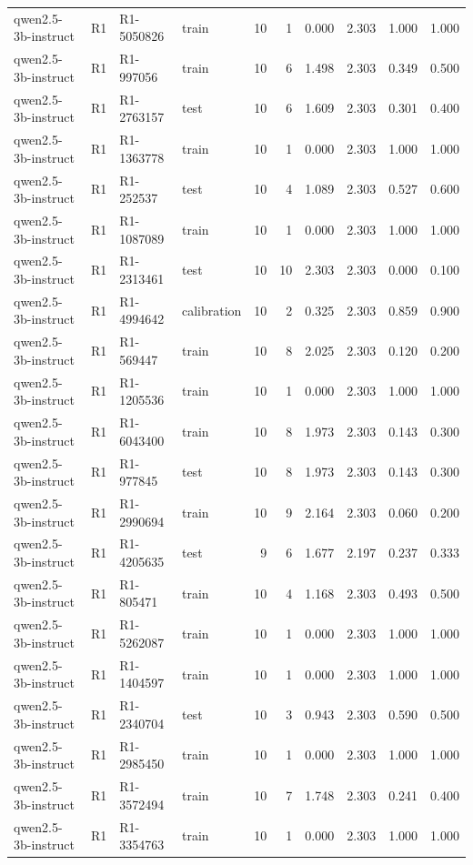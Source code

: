 \begin{table}
\begin{tabular}{llllrrrrrr}
qwen2.5-3b-instruct & R1 & R1-5050826 & train & 10 & 1 & 0.000 & 2.303 & 1.000 & 1.000 \\
qwen2.5-3b-instruct & R1 & R1-997056 & train & 10 & 6 & 1.498 & 2.303 & 0.349 & 0.500 \\
qwen2.5-3b-instruct & R1 & R1-2763157 & test & 10 & 6 & 1.609 & 2.303 & 0.301 & 0.400 \\
qwen2.5-3b-instruct & R1 & R1-1363778 & train & 10 & 1 & 0.000 & 2.303 & 1.000 & 1.000 \\
qwen2.5-3b-instruct & R1 & R1-252537 & test & 10 & 4 & 1.089 & 2.303 & 0.527 & 0.600 \\
qwen2.5-3b-instruct & R1 & R1-1087089 & train & 10 & 1 & 0.000 & 2.303 & 1.000 & 1.000 \\
qwen2.5-3b-instruct & R1 & R1-2313461 & test & 10 & 10 & 2.303 & 2.303 & 0.000 & 0.100 \\
qwen2.5-3b-instruct & R1 & R1-4994642 & calibration & 10 & 2 & 0.325 & 2.303 & 0.859 & 0.900 \\
qwen2.5-3b-instruct & R1 & R1-569447 & train & 10 & 8 & 2.025 & 2.303 & 0.120 & 0.200 \\
qwen2.5-3b-instruct & R1 & R1-1205536 & train & 10 & 1 & 0.000 & 2.303 & 1.000 & 1.000 \\
qwen2.5-3b-instruct & R1 & R1-6043400 & train & 10 & 8 & 1.973 & 2.303 & 0.143 & 0.300 \\
qwen2.5-3b-instruct & R1 & R1-977845 & test & 10 & 8 & 1.973 & 2.303 & 0.143 & 0.300 \\
qwen2.5-3b-instruct & R1 & R1-2990694 & train & 10 & 9 & 2.164 & 2.303 & 0.060 & 0.200 \\
qwen2.5-3b-instruct & R1 & R1-4205635 & test & 9 & 6 & 1.677 & 2.197 & 0.237 & 0.333 \\
qwen2.5-3b-instruct & R1 & R1-805471 & train & 10 & 4 & 1.168 & 2.303 & 0.493 & 0.500 \\
qwen2.5-3b-instruct & R1 & R1-5262087 & train & 10 & 1 & 0.000 & 2.303 & 1.000 & 1.000 \\
qwen2.5-3b-instruct & R1 & R1-1404597 & train & 10 & 1 & 0.000 & 2.303 & 1.000 & 1.000 \\
qwen2.5-3b-instruct & R1 & R1-2340704 & test & 10 & 3 & 0.943 & 2.303 & 0.590 & 0.500 \\
qwen2.5-3b-instruct & R1 & R1-2985450 & train & 10 & 1 & 0.000 & 2.303 & 1.000 & 1.000 \\
qwen2.5-3b-instruct & R1 & R1-3572494 & train & 10 & 7 & 1.748 & 2.303 & 0.241 & 0.400 \\
qwen2.5-3b-instruct & R1 & R1-3354763 & train & 10 & 1 & 0.000 & 2.303 & 1.000 & 1.000 \\

\end{tabular}
\end{table}
